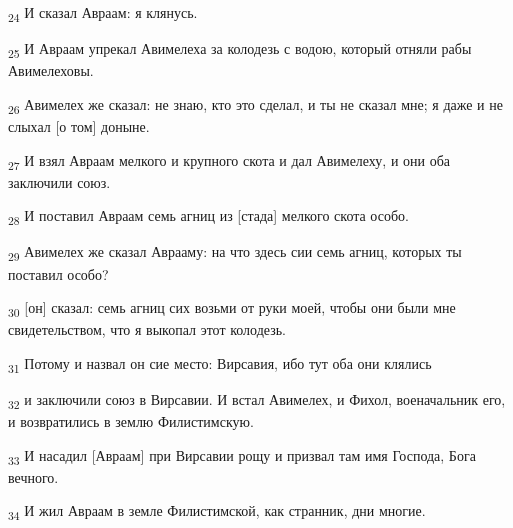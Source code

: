 \begin{tcolorbox}
\textsubscript{24} И сказал Авраам: я клянусь.
\end{tcolorbox}
\begin{tcolorbox}
\textsubscript{25} И Авраам упрекал Авимелеха за колодезь с водою, который отняли рабы Авимелеховы.
\end{tcolorbox}
\begin{tcolorbox}
\textsubscript{26} Авимелех же сказал: не знаю, кто это сделал, и ты не сказал мне; я даже и не слыхал [о том] доныне.
\end{tcolorbox}
\begin{tcolorbox}
\textsubscript{27} И взял Авраам мелкого и крупного скота и дал Авимелеху, и они оба заключили союз.
\end{tcolorbox}
\begin{tcolorbox}
\textsubscript{28} И поставил Авраам семь агниц из [стада] мелкого скота особо.
\end{tcolorbox}
\begin{tcolorbox}
\textsubscript{29} Авимелех же сказал Аврааму: на что здесь сии семь агниц, которых ты поставил особо?
\end{tcolorbox}
\begin{tcolorbox}
\textsubscript{30} [он] сказал: семь агниц сих возьми от руки моей, чтобы они были мне свидетельством, что я выкопал этот колодезь.
\end{tcolorbox}
\begin{tcolorbox}
\textsubscript{31} Потому и назвал он сие место: Вирсавия, ибо тут оба они клялись
\end{tcolorbox}
\begin{tcolorbox}
\textsubscript{32} и заключили союз в Вирсавии. И встал Авимелех, и Фихол, военачальник его, и возвратились в землю Филистимскую.
\end{tcolorbox}
\begin{tcolorbox}
\textsubscript{33} И насадил [Авраам] при Вирсавии рощу и призвал там имя Господа, Бога вечного.
\end{tcolorbox}
\begin{tcolorbox}
\textsubscript{34} И жил Авраам в земле Филистимской, как странник, дни многие.
\end{tcolorbox}
